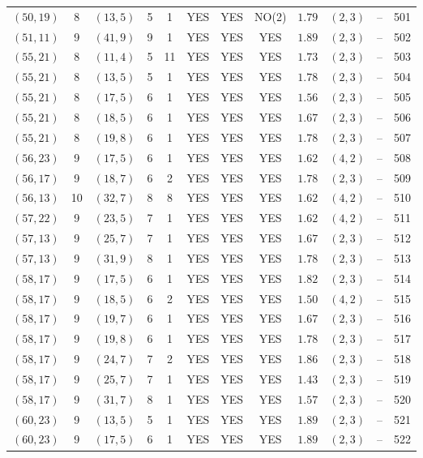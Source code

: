 \begin{longtable}{|c|c|c|c|c|c|c|c|c|c|c|c|}
$(50,19)$ & 8 & $(13,5)$ & 5 & 1 & YES & YES & NO(2) & $1.79$ & $(2,3)$ & -- & 501\\
$(51,11)$ & 9 & $(41,9)$ & 9 & 1 & YES & YES & YES & $1.89$ & $(2,3)$ & -- & 502\\
$(55,21)$ & 8 & $(11,4)$ & 5 & 11 & YES & YES & YES & $1.73$ & $(2,3)$ & -- & 503\\
$(55,21)$ & 8 & $(13,5)$ & 5 & 1 & YES & YES & YES & $1.78$ & $(2,3)$ & -- & 504\\
$(55,21)$ & 8 & $(17,5)$ & 6 & 1 & YES & YES & YES & $1.56$ & $(2,3)$ & -- & 505\\
$(55,21)$ & 8 & $(18,5)$ & 6 & 1 & YES & YES & YES & $1.67$ & $(2,3)$ & -- & 506\\
$(55,21)$ & 8 & $(19,8)$ & 6 & 1 & YES & YES & YES & $1.78$ & $(2,3)$ & -- & 507\\
$(56,23)$ & 9 & $(17,5)$ & 6 & 1 & YES & YES & YES & $1.62$ & $(4,2)$ & -- & 508\\
$(56,17)$ & 9 & $(18,7)$ & 6 & 2 & YES & YES & YES & $1.78$ & $(2,3)$ & -- & 509\\
$(56,13)$ & 10 & $(32,7)$ & 8 & 8 & YES & YES & YES & $1.62$ & $(4,2)$ & -- & 510\\
$(57,22)$ & 9 & $(23,5)$ & 7 & 1 & YES & YES & YES & $1.62$ & $(4,2)$ & -- & 511\\
$(57,13)$ & 9 & $(25,7)$ & 7 & 1 & YES & YES & YES & $1.67$ & $(2,3)$ & -- & 512\\
$(57,13)$ & 9 & $(31,9)$ & 8 & 1 & YES & YES & YES & $1.78$ & $(2,3)$ & -- & 513\\
$(58,17)$ & 9 & $(17,5)$ & 6 & 1 & YES & YES & YES & $1.82$ & $(2,3)$ & -- & 514\\
$(58,17)$ & 9 & $(18,5)$ & 6 & 2 & YES & YES & YES & $1.50$ & $(4,2)$ & -- & 515\\
$(58,17)$ & 9 & $(19,7)$ & 6 & 1 & YES & YES & YES & $1.67$ & $(2,3)$ & -- & 516\\
$(58,17)$ & 9 & $(19,8)$ & 6 & 1 & YES & YES & YES & $1.78$ & $(2,3)$ & -- & 517\\
$(58,17)$ & 9 & $(24,7)$ & 7 & 2 & YES & YES & YES & $1.86$ & $(2,3)$ & -- & 518\\
$(58,17)$ & 9 & $(25,7)$ & 7 & 1 & YES & YES & YES & $1.43$ & $(2,3)$ & -- & 519\\
$(58,17)$ & 9 & $(31,7)$ & 8 & 1 & YES & YES & YES & $1.57$ & $(2,3)$ & -- & 520\\
$(60,23)$ & 9 & $(13,5)$ & 5 & 1 & YES & YES & YES & $1.89$ & $(2,3)$ & -- & 521\\
$(60,23)$ & 9 & $(17,5)$ & 6 & 1 & YES & YES & YES & $1.89$ & $(2,3)$ & -- & 522\\

\end{longtable}
